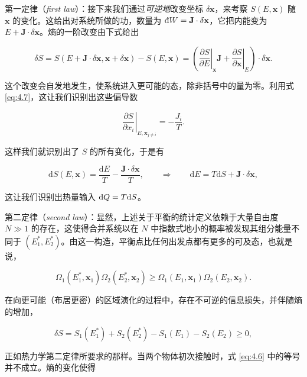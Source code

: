 第一定律（\textit{first law}）：接下来我们通过\emph{可逆地}改变坐标 $\delta\mathbf x$，来考察 $S(E,\mathbf x)$ 随 $\mathbf x$ 的变化。这给出对系统所做的功，数量为 $\inexd W=\mathbf J\cdot\delta\mathbf x$，它把内能变为 $E+\mathbf J\cdot\delta\mathbf x$。熵的一阶改变由下式给出

\begin{equation}\label{eq:4.8}
  \delta S=S(E+\mathbf J\cdot\delta\mathbf x,\mathbf x+\delta\mathbf x)-S(E,\mathbf x)=\left(\left.\frac{\partial S}{\partial E}\right|_{\mathbf x}\mathbf J+\left.\frac{\partial S}{\partial\mathbf x}\right|_E\right)\cdot\delta\mathbf x.
\end{equation}

这个改变会自发地发生，使系统进入更可能的态，除非括号中的量为零。利用式 \eqref{eq:4.7}，这让我们识别出这些偏导数

\begin{equation}\label{eq:4.9}
  \left.\frac{\partial S}{\partial x_i}\right|_{E,\mathbf x_{j\neq i}}=-\frac{J_i}{T}.
\end{equation}

这样我们就识别出了 $S$ 的所有变化，于是有

\begin{equation}\label{eq:4.10}
  \mathrm{d}S(E,\mathbf x)=\frac{\mathrm{d}E}{T}-\frac{\mathbf J\cdot\delta\mathbf x}{T},\qquad\Longrightarrow\qquad \mathrm{d}E=T\mathrm{d}S+\mathbf J\cdot\delta\mathbf x,
\end{equation}

这让我们识别出热量输入 $\inexd Q=T\mathrm{d}S$。

第二定律（\textit{second law}）：显然，上述关于平衡的统计定义依赖于大量自由度 $N\gg1$ 的存在，这使得合并系统以在 $N$ 中指数式地小的概率被发现其组分能量不同于 $(E_1^*,E_2^*)$。由这一构造，平衡点比任何出发点都有更多的可及态，也就是说，

\begin{equation}\label{eq:4.11}
  \Omega_1(E_1^*,\mathbf x_1)\Omega_2(E_2^*,\mathbf x_2)\ge\Omega_1(E_1,\mathbf x_1)\Omega_2(E_2,\mathbf x_2).
\end{equation}

在向更可能（布居更密）的区域演化的过程中，存在不可逆的信息损失，并伴随熵的增加，

\begin{equation}\label{eq:4.12}
  \delta S=S_1(E_1^*)+S_2(E_2^*)-S_1(E_1)-S_2(E_2)\ge0,
\end{equation}

正如热力学第二定律所要求的那样。当两个物体初次接触时，式 \eqref{eq:4.6} 中的等号并不成立。熵的变化使得

